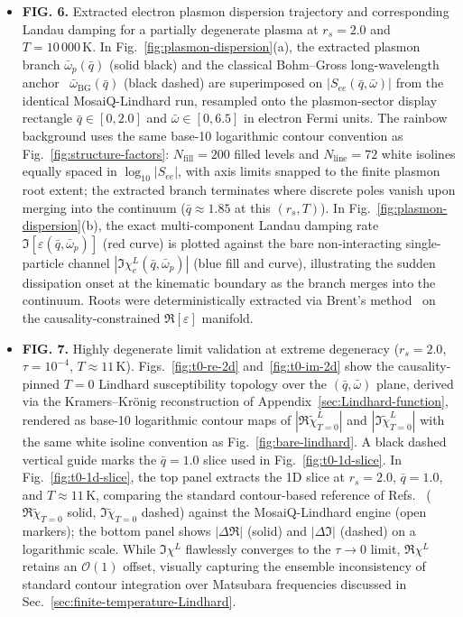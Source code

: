 \documentclass[aps,showkeys,noshowpacs,superscriptaddress,pre,preprint]{revtex4-2}
\begin{document}
\begin{itemize}
    \item \textbf{FIG. 6.} Extracted electron plasmon dispersion trajectory and corresponding Landau damping for a partially degenerate plasma at $r_s = 2.0$ and $T = 10\,000\,\mathrm{K}$.
    In Fig.~\ref{fig:plasmon-dispersion}(a), the extracted plasmon branch $\bar{\omega}_p(\bar{q})$ (solid black) and the classical Bohm--Gross long-wavelength anchor~\cite{Bohm-Gross1949} $\bar{\omega}_{\mathrm{BG}}(\bar{q})$ (black dashed) are superimposed on $|S_{ee}(\bar{q}, \bar{\omega})|$ from the identical MosaiQ-Lindhard run, resampled onto the plasmon-sector display rectangle $\bar{q} \in [0, 2.0]$ and $\bar{\omega} \in [0, 6.5]$ in electron Fermi units.
    The rainbow background uses the same base-10 logarithmic contour convention as Fig.~\ref{fig:structure-factors}: $N_{\mathrm{fill}}=200$ filled levels and $N_{\mathrm{line}}=72$ white isolines equally spaced in $\log_{10}|S_{ee}|$, with axis limits snapped to the finite plasmon root extent; the extracted branch terminates where discrete poles vanish upon merging into the continuum ($\bar{q} \approx 1.85$ at this $(r_s, T)$).
    In Fig.~\ref{fig:plasmon-dispersion}(b), the exact multi-component Landau damping rate $\Im[\varepsilon(\bar{q}, \bar{\omega}_p)]$ (red curve) is plotted against the bare non-interacting single-particle channel $|\Im \chi_e^L(\bar{q}, \bar{\omega}_p)|$ (blue fill and curve), illustrating the sudden dissipation onset at the kinematic boundary as the branch merges into the continuum.
    Roots were deterministically extracted via Brent's method~\cite{Brent1973} on the causality-constrained $\Re[\varepsilon]$ manifold.

    \item \textbf{FIG. 7.} Highly degenerate limit validation at extreme degeneracy ($r_s = 2.0$, $\tau = 10^{-4}$, $T \approx 11\,\mathrm{K}$). Figs.~\ref{fig:t0-re-2d} and~\ref{fig:t0-im-2d} show the causality-pinned $T = 0$ Lindhard susceptibility topology over the $(\bar{q}, \bar{\omega})$ plane, derived via the Kramers--Kr\"onig reconstruction of Appendix~\ref{sec:Lindhard-function}, rendered as base-10 logarithmic contour maps of $|\Re \tilde{\chi}^L_{T=0}|$ and $|\Im \tilde{\chi}^L_{T=0}|$ with the same white isoline convention as Fig.~\ref{fig:bare-lindhard}. A black dashed vertical guide marks the $\bar{q} = 1.0$ slice used in Fig.~\ref{fig:t0-1d-slice}. In Fig.~\ref{fig:t0-1d-slice}, the top panel extracts the 1D slice at $r_s = 2.0$, $\bar{q} = 1.0$, and $T \approx 11\,\mathrm{K}$, comparing the standard contour-based reference of Refs.~\cite{Giuliani-Vignale2005,Gouedard-Deutsch1978} ($\Re \tilde{\chi}_{T=0}$ solid, $\Im \tilde{\chi}_{T=0}$ dashed) against the MosaiQ-Lindhard engine (open markers); the bottom panel shows $|\Delta \Re|$ (solid) and $|\Delta \Im|$ (dashed) on a logarithmic scale. While $\Im \chi^L$ flawlessly converges to the $\tau \rightarrow 0$ limit, $\Re \chi^L$ retains an $\mathcal{O}(1)$ offset, visually capturing the ensemble inconsistency of standard contour integration over Matsubara frequencies discussed in Sec.~\ref{sec:finite-temperature-Lindhard}.


\end{itemize}
\end{document}
